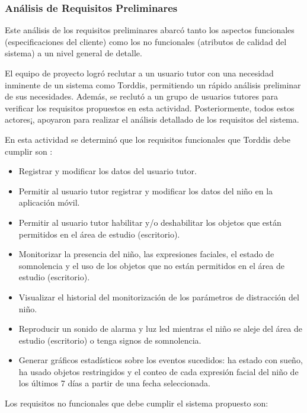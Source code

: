 \documentclass[a4paper,fleqn]{cas-sc}
\begin{document}
				\subsubsection*{Análisis de Requisitos Preliminares}
					Este análisis de los requisitos preliminares abarcó tanto los aspectos funcionales (especificaciones del cliente) como los no funcionales (atributos de calidad del sistema) a un nivel general de detalle.
					
					El equipo de proyecto logró reclutar a un usuario tutor con una necesidad inminente de un sistema como Torddis, permitiendo un rápido análisis preliminar de sus necesidades. Además, se reclutó a un grupo de usuarios tutores para verificar los requisitos propuestos en esta actividad. Posteriormente, todos estos actores¡, apoyaron para realizar el análisis detallado de los requisitos del sistema.
					
					En esta actividad se determinó que los requisitos funcionales que Torddis debe cumplir son \citep{Asish2022Detecting,Pabba2022AnIntelligent,Vettivel2018System}:%
					
					\begin{itemize}
						\item Registrar y modificar los datos del usuario tutor.
						\item Permitir al usuario tutor registrar y modificar los datos del niño en la aplicación móvil.
						\item Permitir al usuario tutor habilitar y/o deshabilitar los objetos que están permitidos en el área de estudio (escritorio).
						\item Monitorizar la presencia del niño, las expresiones faciales, el estado de somnolencia y el uso de los objetos que no están permitidos en el área de estudio (escritorio).
						\item Visualizar el historial del monitorización de los parámetros de distracción del niño.
						\item Reproducir un sonido de alarma y luz led mientras el niño se aleje del área de estudio (escritorio) o tenga signos de somnolencia.
						\item Generar gráficos estadísticos sobre los eventos sucedidos: ha estado con sueño, ha usado objetos restringidos y el conteo de cada expresión facial del niño de los últimos 7 días a partir de una fecha seleccionada.
					\end{itemize}
					
					Los requisitos no funcionales que debe cumplir el sistema propuesto son:
					
\end{document}
